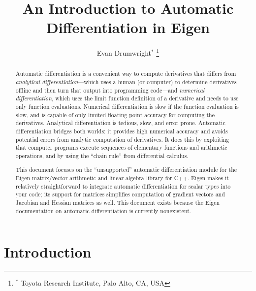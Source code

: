\documentclass[letterpaper, 12 pt, onecolumn, journal]{IEEEtran}  %
\title{\LARGE \bf An Introduction to Automatic Differentiation in Eigen}
\author{Evan Drumwright$^*$%
\thanks{$^*$ Toyota Research Institute, Palo Alto, CA, USA}
}
\begin{document}
\maketitle
\thispagestyle{empty}
\pagestyle{empty}


\begin{abstract}
Automatic differentiation is a convenient way to compute derivatives that differs from \emph{analytical differentiation}---which uses a human (or computer) to determine derivatives offline and then turn that output into programming code---and \emph{numerical differentiation}, which uses the limit function definition of a derivative and needs to use only function evaluations. Numerical differentiation is slow if the function evaluation is slow, and is capable of only limited floating point accuracy for computing the derivatives. Analytical differentiation is tedious, slow, and error prone. Automatic differentiation bridges both worlds: it provides high numerical accuracy and avoids potential errors from analytic computation of derivatives. It does this by exploiting that computer programs execute sequences of elementary functions and arithmetic operations, and by using the ``chain rule'' from differential calculus.

This document focuses on the ``unsupported'' automatic differentiation module for the Eigen matrix/vector arithmetic and linear algebra library for C++. Eigen makes it relatively straightforward to integrate automatic differentiation for scalar types into your code; its support for matrices simplifies computation of gradient vectors and Jacobian and Hessian matrices as well. This document exists because the Eigen documentation on automatic differentiation is currently nonexistent.
\end{abstract}


\section{Introduction}\label{section:introduction}
\end{document}
